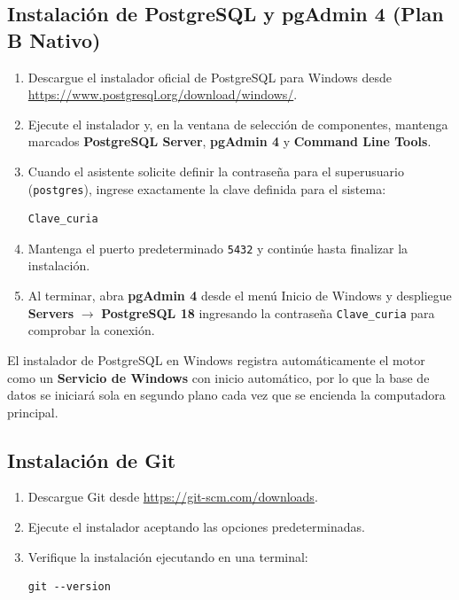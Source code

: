 \subsection{Instalación de PostgreSQL y pgAdmin 4 (Plan B Nativo)}
\begin{enumerate}
    \item Descargue el instalador oficial de PostgreSQL para Windows desde \url{https://www.postgresql.org/download/windows/}.
    \item Ejecute el instalador y, en la ventana de selección de componentes, mantenga marcados \textbf{PostgreSQL Server}, \textbf{pgAdmin 4} y \textbf{Command Line Tools}.
    \item Cuando el asistente solicite definir la contraseña para el superusuario (\texttt{postgres}), ingrese exactamente la clave definida para el sistema:
    \begin{lstlisting}[style=consola]
Clave_curia
\end{lstlisting}
    \item Mantenga el puerto predeterminado \texttt{5432} y continúe hasta finalizar la instalación.
    \item Al terminar, abra \textbf{pgAdmin 4} desde el menú Inicio de Windows y despliegue \textbf{Servers} $\rightarrow$ \textbf{PostgreSQL 18} ingresando la contraseña \texttt{Clave\_curia} para comprobar la conexión.
\end{enumerate}

\begin{consejo}
El instalador de PostgreSQL en Windows registra automáticamente el motor como un \textbf{Servicio de Windows} con inicio automático, por lo que la base de datos se iniciará sola en segundo plano cada vez que se encienda la computadora principal.
\end{consejo}

\subsection{Instalación de Git}
\begin{enumerate}
    \item Descargue Git desde \url{https://git-scm.com/downloads}.
    \item Ejecute el instalador aceptando las opciones predeterminadas.
    \item Verifique la instalación ejecutando en una terminal:
    \begin{lstlisting}[style=consola]
git --version
\end{lstlisting}
\end{enumerate}

